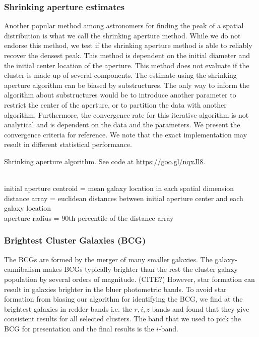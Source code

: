 \subsubsection{Shrinking aperture estimates}
Another popular method among astronomers for finding the peak of a spatial
distribution is what we call the shrinking aperture method.
While we do not endorse this method,
we test if the shrinking aperture method is able to reliably recover the 
densest peak.
This method is dependent on the initial diameter and the initial center 
location of the aperture.
This method does not evaluate if the cluster is made up of
several components.
The estimate using the shrinking aperture algorithm can be biased by
substructures. The only way to inform the algorithm about substructures would
be to introduce another parameter to restrict the center of the aperture, or to
partition the data with another algorithm.
Furthermore, the convergence rate for this iterative algorithm is not
analytical and is dependent on the data and the parameters. We present the
convergence criteria for reference. 
We note that the exact implementation may result in different statistical 
performance.  
\begin{algorithm}
	\caption{Shrinking aperture algorithm. See code at
		\href{https://goo.gl/nqxJl8}{https://goo.gl/nqxJl8}.
	}
	 \hrulefill \\

	 initial aperture centroid = mean galaxy location in each spatial dimension\\
 	distance array = euclidean distances between initial aperture center and each galaxy
	location \\
 	aperture radius = 90th percentile of the distance array\\ 
	   \hrulefill
 \end{algorithm}


\subsubsection{Brightest Cluster Galaxies (BCG)}
The BCGs are formed by the merger of many smaller
galaxies. The galaxy-cannibalism makes BCGs typically brighter than the rest 
the cluster galaxy population by several orders of magnitude. (CITE?)
However, star formation can result
in galaxies brighter in the bluer photometric bands.
To avoid star formation from biasing our algorithm for identifying the
BCG, we find at the brightest galaxies in redder bands i.e. the $r, i, z$
bands and found that they give consistent results for all selected clusters. 
The band that we used to pick the BCG for presentation and the final results 
is the $i$-band. 

